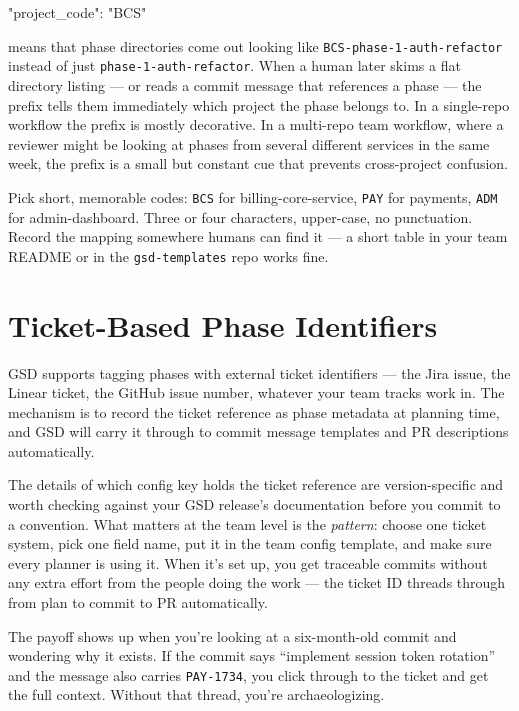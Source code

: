 \documentclass[11pt,letterpaper,openany]{book}
\begin{document}
\begin{gsdjson}
{
  "project_code": "BCS"
}
\end{gsdjson}

\noindent
means that phase directories come out looking like
\texttt{BCS-phase-1-auth-refactor} instead of just
\texttt{phase-1-auth-refactor}. When a human later skims a flat
directory listing --- or reads a commit message that references a
phase --- the prefix tells them immediately which project the
phase belongs to. In a single-repo workflow the prefix is mostly
decorative. In a multi-repo team workflow, where a reviewer might
be looking at phases from several different services in the same
week, the prefix is a small but constant cue that prevents
cross-project confusion.

Pick short, memorable codes: \texttt{BCS} for billing-core-service,
\texttt{PAY} for payments, \texttt{ADM} for admin-dashboard. Three
or four characters, upper-case, no punctuation. Record the mapping
somewhere humans can find it --- a short table in your team README
or in the \texttt{gsd-templates} repo works fine.

\section{Ticket-Based Phase Identifiers}

GSD supports tagging phases with external ticket identifiers ---
the Jira issue, the Linear ticket, the GitHub issue number, whatever
your team tracks work in. The mechanism is to record the ticket
reference as phase metadata at planning time, and GSD will carry it
through to commit message templates and PR descriptions automatically.

The details of which config key holds the ticket reference are
version-specific and worth checking against your GSD release's
documentation before you commit to a convention. What matters at
the team level is the \emph{pattern}: choose one ticket system,
pick one field name, put it in the team config template, and make
sure every planner is using it. When it's set up, you get traceable
commits without any extra effort from the people doing the work ---
the ticket ID threads through from plan to commit to PR automatically.

The payoff shows up when you're looking at a six-month-old
commit and wondering why it exists. If the commit says ``implement
session token rotation'' and the message also carries
\texttt{PAY-1734}, you click through to the ticket and get the full
context. Without that thread, you're archaeologizing.
\end{document}
